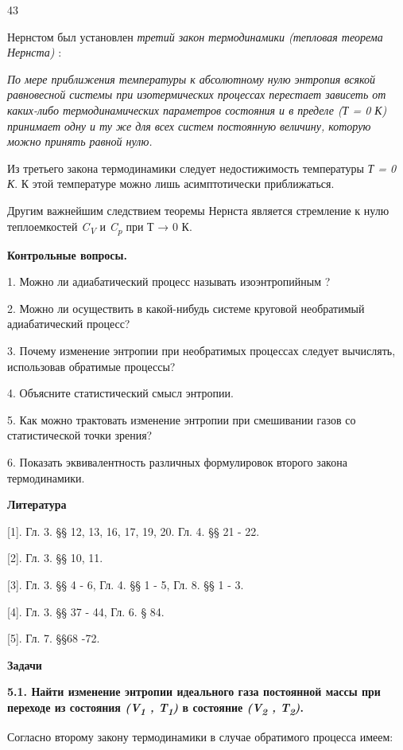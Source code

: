 43

Нернстом был установлен \emph{третий закон термодинамики (тепловая
теорема Нернста)} :

\emph{По мере приближения температуры к абсолютному нулю энтропия всякой
равновесной системы при изотермических процессах перестает зависеть от
каких-либо термодинамических параметров состояния и в пределе (Т = 0 К)
принимает одну и ту же для всех систем постоянную величину, которую
можно принять равной нулю.}

Из третьего закона термодинамики следует недостижимость температуры
\emph{Т = 0 К}. К этой температуре можно лишь асимптотически
приближаться.

Другим важнейшим следствием теоремы Нернста является стремление к нулю
теплоемкостей \emph{C\textsubscript{V }} и \emph{C\textsubscript{p}} при
Т → 0 К.

\textbf{Контрольные вопросы.}

1. Можно ли адиабатический процесс называть изоэнтропийным ?

2. Можно ли осуществить в какой-нибудь системе круговой необратимый
адиабатический процесс?

3. Почему изменение энтропии при необратимых процессах следует
вычислять, использовав обратимые процессы?

4. Объясните статистический смысл энтропии.

5. Как можно трактовать изменение энтропии при смешивании газов со
статистической точки зрения?

6. Показать эквивалентность различных формулировок второго закона
термодинамики.

\textbf{Литература}

{[}1{]}. Гл. 3. §§ 12, 13, 16, 17, 19, 20. Гл. 4. §§ 21 - 22.

{[}2{]}. Гл. 3. §§ 10, 11.

{[}3{]}. Гл. 3. §§ 4 - 6, Гл. 4. §§ 1 - 5, Гл. 8. §§ 1 - 3.

{[}4{]}. Гл. 3. §§ 37 - 44, Гл. 6. § 84.

{[}5{]}. Гл. 7. §§68 -72.

\textbf{Задачи}

\textbf{5.1. Найти изменение энтропии идеального газа постоянной массы
при переходе из состояния \emph{(V\textsubscript{1} ,
T\textsubscript{1})} в состояние \emph{(V\textsubscript{2} ,
T\textsubscript{2})}.}

\solving{}

Согласно второму закону термодинамики в случае обратимого процесса
имеем:


